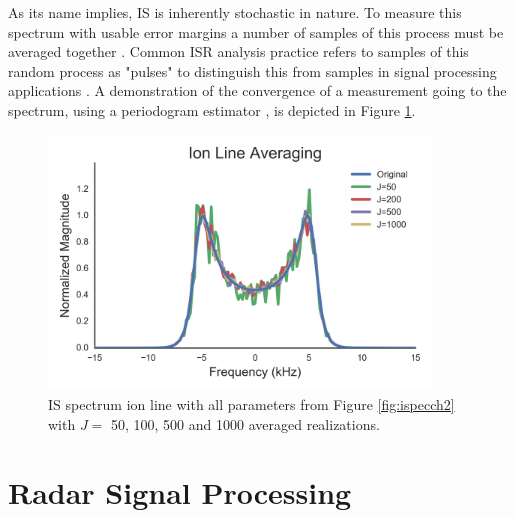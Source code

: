 As its name implies, IS is inherently stochastic in nature. To measure this spectrum with usable error margins a number of samples of this process must be averaged together \cite{Diaz:2008co}. Common ISR analysis practice refers to samples of this random process as "pulses" to distinguish this from samples in signal processing applications \cite{dtsp:openhiem}. A demonstration of the convergence of a measurement going to the spectrum, using a periodogram estimator \cite{kay1988modern}, is depicted in Figure \ref{fig:ispecch2ave}.
\begin{figure}[!t]
\centering
\includegraphics[width=4in]{Specionave}
\caption{IS spectrum ion line with all parameters from Figure \ref{fig:ispecch2} with $J =$ 50, 100, 500 and 1000 averaged realizations. }
\label{fig:ispecch2ave}
\end{figure}

\section{Radar Signal Processing}

